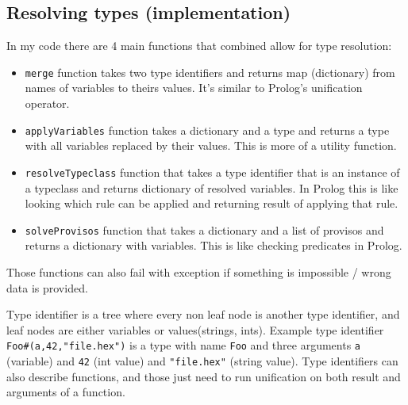 \documentclass[14pt]{report}
\begin{document}
\subsection{Resolving types (implementation)}
In my code there are 4 main functions that combined allow for type resolution:
\begin{itemize}
    \item \verb!merge! function takes two type identifiers and returns map (dictionary) from names of variables to theirs values. It's similar to Prolog's unification operator.
    \item \verb!applyVariables! function takes a dictionary and a type and returns a type with all variables replaced by their values. This is more of a utility function.
    \item \verb!resolveTypeclass! function that takes a type identifier that is an instance of a typeclass and returns dictionary of resolved variables. In Prolog this is like looking which rule can be applied and returning result of applying that rule.
    \item \verb!solveProvisos! function that takes a dictionary and a list of provisos and returns a dictionary with variables. This is like checking predicates in Prolog.
\end{itemize}
Those functions can also fail with exception if something is impossible / wrong data is provided.

Type identifier is a tree where every non leaf node is another type identifier, and leaf nodes are either variables or values(strings, ints). Example type identifier \verb!Foo#(a,42,"file.hex")! is a type with name \verb!Foo! and three arguments \verb!a! (variable) and \verb!42! (int value) and \verb!"file.hex"! (string value). Type identifiers can also describe functions, and those just need to run unification on both result and arguments of a function.
\end{document}
